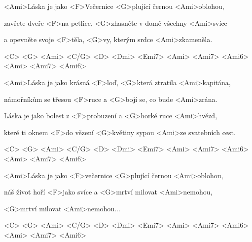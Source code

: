 

\zs
<Ami>Láska je jako <F>Večernice <G>plující černou <Ami>oblohou,

zavřete dveře <F>na petlice, <G>zhasněte v domě všechny <Ami>svíce

a opevněte svoje <F>těla, <G>vy, kterým srdce <Ami>zkameněla.

<C> <G> <Ami> <C/G> <D> <Dmi> <Emi7> <Ami> <Ami7> <Ami6> <Ami> <Ami7> <Ami6>
\ks

\zs
<Ami>Láska je jako krásná <F>loď, <G>která ztratila <Ami>kapitána,

námořníkům se třesou <F>ruce a <G>bojí se, co bude <Ami>zrána.

Láska je jako bolest z <F>probuzení a <G>horké ruce <Ami>hvězd,

které ti oknem <F>do vězení <G>květiny sypou <Ami>ze svatebních cest.

<C> <G> <Ami> <C/G> <D> <Dmi> <Emi7> <Ami> <Ami7> <Ami6> <Ami> <Ami7> <Ami6>
\ks

\zs
<Ami>Láska je jako <F>večernice <G>plující černou <Ami>oblohou,

náš život hoří <F>jako svíce a <G>mrtví milovat <Ami>nemohou,

<G>mrtví milovat <Ami>nemohou...

<C> <G> <Ami> <C/G> <D> <Dmi> <Emi7> <Ami> <Ami7> <Ami6> <Ami> <Ami7> <Ami6>
\ks

\kp






















